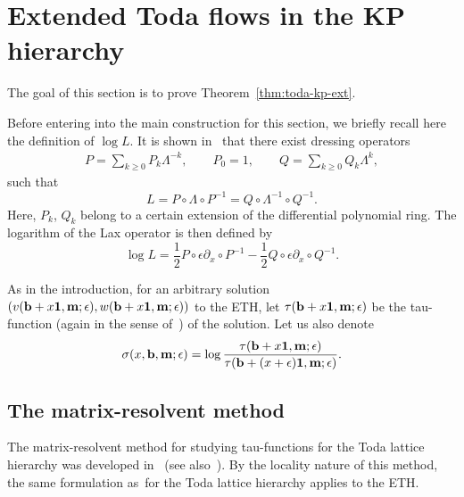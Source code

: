 \documentclass[11pt]{article}
\numberwithin{equation}{section}
\newcommand{\e}{\epsilon}
\newcommand{\p}{\partial}
\newcommand{\beq}{\begin{equation}}
\newcommand{\eeq}{\end{equation}}
\numberwithin{equation}{section}
\begin{document}
\section{Extended Toda flows in the KP hierarchy}\label{sectionTodaext}
The goal of this section is to prove Theorem~\ref{thm:toda-kp-ext}.

Before entering into the main construction for this section, we briefly recall here the definition of $\log L$.
It is shown in~\cite{CDZ} that there exist dressing operators
\begin{align*}%
P= \sum_{k\ge0} P_k \Lambda^{-k}, \qquad P_0= 1,\qquad
Q= \sum_{k\ge0} Q_k \Lambda^k, %
\end{align*}
such that
\[
L=P\circ\Lambda\circ P^{-1}=Q\circ\Lambda^{-1}\circ Q^{-1}.
\]
Here, $P_k$, $Q_k$ belong to a certain extension of the differential polynomial ring.
The logarithm of the Lax operator is then defined by~\cite{CDZ}
\[
\log L= \frac12 P\circ \e\p_x \circ P^{-1} - \frac12 Q\circ \e\p_x \circ Q^{-1}.
\]

As in the introduction, for an arbitrary solution $(v({\bf b}+x{\bf 1}, {\bf m};\e), w({\bf b}+x{\bf 1}, {\bf m};\e))$ to the ETH,
let $\tau({\bf b}+x{\bf 1}, {\bf m};\e)$ be the tau-function (again in the sense of~\cite{CDZ, DZ-toda})
 of the solution. Let us also denote
 \beq\label{defsigma}
 \sigma(x, {\bf b}, {\bf m};\e) = \log\frac{\tau({\bf b}+x{\bf 1}, {\bf m};\e)}{\tau({\bf b}+(x+\e){\bf 1}, {\bf m};\e)}.
 \eeq

\subsection{The matrix-resolvent method}
The matrix-resolvent method for studying tau-functions for the Toda lattice hierarchy was developed in~\cite{DY} (see also~\cite{Y}).
By the locality nature of this method, the same formulation as~for the Toda lattice hierarchy
applies to the ETH.
\end{document}
